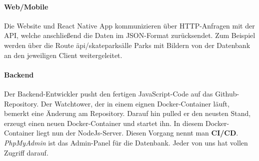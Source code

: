 \paragraph{Web/Mobile}
Die Website und React Native App kommunizieren über HTTP-Anfragen mit der API, welche anschließend
die Daten im JSON-Format zurücksendet. Zum Beispiel werden über die Route \"api/skateparks\" alle
Parks mit Bildern von der Datenbank an den jeweiligen Client weitergeleitet.

\paragraph{Backend}
Der Backend-Entwickler pusht den fertigen JavaScript-Code auf das Github-Repository.
Der Watchtower, der in einem eignen Docker-Container läuft, bemerkt eine Änderung am Repository. Darauf hin
pulled er den neusten Stand, erzeugt einen neuen Docker-Container und startet ihn. In diesem
Docker-Container liegt nun der NodeJs-Server. Diesen Vorgang nennt man \textbf{CI/CD}. \textit{PhpMyAdmin} ist das
Admin-Panel für die Datenbank. Jeder von uns hat vollen Zugriff darauf.